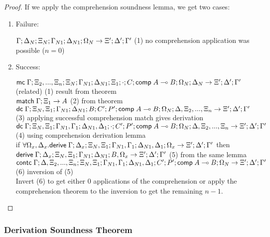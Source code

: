 \begin{proof}
   If we apply the comprehension soundness lemma, we get two cases:
   
   \begin{enumerate}
      \item Failure:
      
      $\do \Gamma; \Delta_N; \Xi_N; \Gamma_{N1}; \Delta_{N1}; \Omega_N \rightarrow \Xi'; \Delta'; \Gamma'$ \hfill (1) no comprehension application was possible ($n = 0$)\\
      
      \item Success:
      
      $\mathsf{mc} \; \Gamma; \Xi_2, ..., \Xi_n; \Xi_N; \Gamma_{N1}; \Delta_{N1}; \Xi_1; \cdot; C; \mathsf{comp} \; A \multimap B; \Omega_N; \Delta_N \rightarrow \Xi'; \Delta'; \Gamma'$ (related) \hfill (1) result from theorem \\
      $\mathsf{match} \; \Gamma; \Xi_1 \rightarrow A$ \hfill (2) from theorem \\
      $\mathsf{dc} \; \Gamma; \Xi_N, \Xi_1; \Gamma_{N1}; \Delta_{N1}; B; C'; P'; \mathsf{comp} \; A \multimap B; \Omega_N; \Delta, \Xi_2, ..., \Xi_n \rightarrow \Xi'; \Delta'; \Gamma'$ \hfill (3) applying successful comprehension match gives derivation \\
      $\mathsf{dc} \; \Gamma; \Xi_N, \Xi_1; \Gamma_{N1}, \Gamma_1; \Delta_{N1}, \Delta_1; \cdot; C'; P'; \mathsf{comp} \; A \multimap B; \Omega_N; \Delta, \Xi_2, ..., \Xi_n \rightarrow \Xi'; \Delta'; \Gamma'$ \hfill (4) using comprehension derivation lemma \\
      if $\forall \Omega_x, \Delta_x. \mathsf{derive} \; \Gamma; \Delta_x; \Xi_N, \Xi_1; \Gamma_{N1}, \Gamma_1; \Delta_{N1}, \Delta_1; \Omega_x \rightarrow \Xi'; \Delta'; \Gamma'$ then $\mathsf{derive} \; \Gamma; \Delta_x; \Xi_N, \Xi_1; \Gamma_{N1}; \Delta_{N1}; B, \Omega_x \rightarrow \Xi'; \Delta'; \Gamma'$ \hfill (5) from the same lemma \\
      $\mathsf{contc} \; \Gamma; \Delta, \Xi_2, ..., \Xi_n; \Xi_N, \Xi_1; \Gamma_{N1}, \Gamma_1; \Delta_{N1}, \Delta_1; C'; P'; \mathsf{comp} \; A \multimap B; \Omega_N \rightarrow \Xi'; \Delta'; \Gamma'$ \hfill (6) inversion of (5) \\
      
      Invert (6) to get either $0$ applications of the comprehension or apply the comprehension theorem to the inversion to get the remaining $n-1$. 
   \end{enumerate}
\end{proof}

\subsubsection{Derivation Soundness Theorem}

